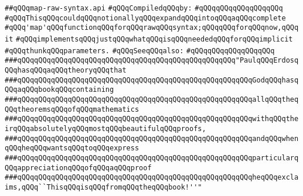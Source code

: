 \label{src/lib/compiler/front/parser/raw-syntax/map-raw-syntax.api}
\verb|##qQQqmap-raw-syntax.api|\newline
\newline
\verb|#qQQqCompiledqQQqby:|\newline
\verb|#qQQqqQQqqQQqqQQqqQQq|\newline
\newline
\newline
\newline
\verb|#qQQqThisqQQqcouldqQQqnotionallyqQQqexpandqQQqintoqQQqaqQQqcomplete|\newline
\verb|#qQQq'map'qQQqfunctionqQQqforqQQqrawqQQqsyntax;qQQqqQQqforqQQqnow,qQQqit|\newline
\verb|#qQQqimplementsqQQqjustqQQqwhatqQQqisqQQqneededqQQqforqQQqimplicit|\newline
\verb|#qQQqthunkqQQqparameters.|\newline
\newline
\verb|#qQQqSeeqQQqalso:|\newline
\verb|#qQQqqQQqqQQqqQQqqQQq|\newline
\newline
\newline
\newline
\verb|###qQQqqQQqqQQqqQQqqQQqqQQqqQQqqQQqqQQqqQQqqQQqqQQqqQQq"PaulqQQqErdosqQQqhasqQQqaqQQqtheoryqQQqthat|\newline
\verb|###qQQqqQQqqQQqqQQqqQQqqQQqqQQqqQQqqQQqqQQqqQQqqQQqqQQqqQQqGodqQQqhasqQQqaqQQqbookqQQqcontaining|\newline
\verb|###qQQqqQQqqQQqqQQqqQQqqQQqqQQqqQQqqQQqqQQqqQQqqQQqqQQqqQQqallqQQqtheqQQqtheoremsqQQqofqQQqmathematics|\newline
\verb|###qQQqqQQqqQQqqQQqqQQqqQQqqQQqqQQqqQQqqQQqqQQqqQQqqQQqqQQqwithqQQqtheirqQQqabsolutelyqQQqmostqQQqbeautifulqQQqproofs,|\newline
\verb|###qQQqqQQqqQQqqQQqqQQqqQQqqQQqqQQqqQQqqQQqqQQqqQQqqQQqqQQqandqQQqwhenqQQqheqQQqwantsqQQqtoqQQqexpress|\newline
\verb|###qQQqqQQqqQQqqQQqqQQqqQQqqQQqqQQqqQQqqQQqqQQqqQQqqQQqqQQqparticularqQQqappreciationqQQqofqQQqaqQQqproof|\newline
\verb|###qQQqqQQqqQQqqQQqqQQqqQQqqQQqqQQqqQQqqQQqqQQqqQQqqQQqqQQqheqQQqexclaims,qQQq``ThisqQQqisqQQqfromqQQqtheqQQqbook!''"|\newline
